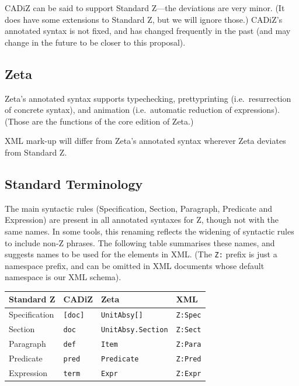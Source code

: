 \documentclass{llncs}  %
\newcommand{\AFont}[1]{\texttt{#1}}
\newcommand{\CADiZ}{CADiZ}
\newcommand{\Zeta}{Zeta}
\newcommand{\ASpecification}{Specification}
\newcommand{\ASection}{Section}
\newcommand{\AParagraph}{Paragraph}
\newcommand{\APredicate}{Predicate}
\newcommand{\AExpression}{Expression}
\begin{document}
\CADiZ\cite{CADiZ} can be said to support Standard Z---the deviations
are very minor.
(It does have some extensions to Standard Z, but we will ignore those.)
\CADiZ's annotated syntax is not fixed, and has changed frequently in the
past (and may change in the future to be closer to this proposal). 

\subsection{\Zeta}

\Zeta's annotated syntax supports typechecking,
prettyprinting (i.e.\ resurrection of concrete syntax),
and animation (i.e.\ automatic reduction of expressions).
(Those are the functions of the core edition of \Zeta.)

XML mark-up will differ from \Zeta's annotated syntax
wherever \Zeta\cite{Zeta} deviates from Standard Z.

\subsection{Standard Terminology}

The main syntactic rules (Specification, Section, Paragraph, Predicate and
Expression) are present in all annotated syntaxes for Z, though not with
the same names.  In some tools, this renaming reflects the widening of
syntactic rules to include non-Z phrases.  The following table summarises
these names, and suggests names to be used for the elements in XML.
(The \verb!Z:! prefix is just a namespace prefix, and can be omitted
in XML documents whose default namespace is our XML schema).

\begin{center}
\begin{tabular}{|l|l|l|l|}
\hline
{\bf Standard Z} & {\bf \CADiZ} & {\bf \Zeta} & {\bf XML}\\
\hline
\ASpecification & \AFont{[doc]} & \AFont{UnitAbsy[]} & \AFont{Z:Spec}\\
\ASection & \AFont{doc} & \AFont{UnitAbsy.Section} & \AFont{Z:Sect}\\
\AParagraph & \AFont{def} & \AFont{Item} & \AFont{Z:Para}\\
\APredicate & \AFont{pred} & \AFont{Predicate} & \AFont{Z:Pred}\\
\AExpression & \AFont{term} & \AFont{Expr} & \AFont{Z:Expr}\\
\hline
\end{tabular}
\end{center}
\end{document}
